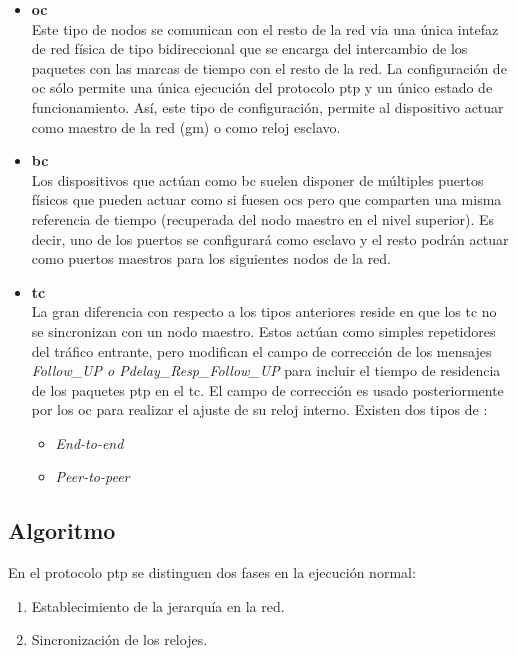 \begin{itemize}	
	\item \textbf{\acrfull{oc}} \\
	Este tipo de nodos se comunican con el resto de la red via una única 
	intefaz de red física de tipo bidireccional que se encarga del intercambio 
	de los paquetes con las marcas de tiempo con el resto de la red. La 
	configuración de \gls{oc} sólo permite una única ejecución del protocolo 
	\gls{ptp} y un único estado de funcionamiento. Así, este tipo de 
	configuración, permite al dispositivo actuar como maestro de la red 
	(\gls{gm}) o como reloj esclavo.
	
	\item \textbf{\acrfull{bc}} \\
	Los dispositivos que actúan como \gls{bc} suelen disponer de múltiples 
	puertos físicos que pueden actuar como si fuesen \gls{oc}s pero que 
	comparten una misma referencia de tiempo (recuperada del nodo maestro en el 
	nivel superior). Es decir, uno de los puertos se configurará como esclavo y 
	el resto podrán actuar como puertos maestros para los siguientes nodos de 
	la red.
	
	\item \textbf{\acrfull{tc}} \\
	La gran diferencia con respecto a los tipos anteriores reside en que los 
	\gls{tc} no se sincronizan con un nodo maestro. Estos actúan como simples 
	repetidores del tráfico entrante, pero modifican el campo de corrección de 
	los mensajes \textit{Follow\_UP o Pdelay\_Resp\_Follow\_UP} para incluir el 
	tiempo de residencia de los paquetes \gls{ptp} en el \gls{tc}. El campo de 
	corrección es usado posteriormente por los \gls{oc} para realizar el ajuste 
	de su reloj interno. 
	Existen dos tipos de :
	\begin{itemize}
		\item \textit{End-to-end}
		\item \textit{Peer-to-peer}
	\end{itemize}
\end{itemize}

\subsection{Algoritmo}

En el protocolo \gls{ptp} se distinguen dos fases en la ejecución normal:
\begin{enumerate}
	\item Establecimiento de la jerarquía en la red.
	\item Sincronización de los relojes.
\end{enumerate}

